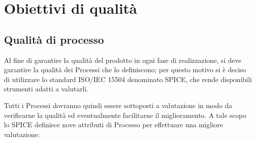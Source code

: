 \section{Obiettivi di qualità} 
\subsection{Qualità di processo}

Al fine di garantire la qualità del prodotto in ogni fase di realizzazione, si deve garantire la qualità dei Processi che lo definiscono; per questo motivo si è deciso di utilizzare lo standard ISO/IEC 15504 denominato SPICE, che rende disponibili strumenti adatti a valutarli.


Tutti i Processi dovranno quindi essere sottoposti a valutazione in modo da verificarne la qualità ed eventualmente facilitarne il miglioramento. A tale scopo lo SPICE definisce nove attributi di Processo per effettuare una migliore valutazione:
